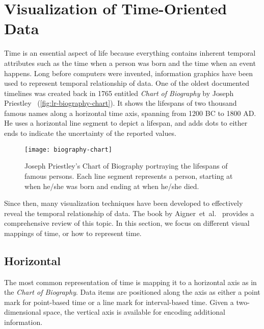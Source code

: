 \section{Visualization of Time-Oriented Data}
Time is an essential aspect of life because everything contains inherent temporal attributes such as the time when a person was born and the time when an event happens. Long before computers were invented, information graphics have been used to represent temporal relationship of data. One of the oldest documented timelines was created back in 1765 entitled \emph{Chart of Biography} by Joseph Priestley~\cite{Priestley1765} (\autoref{fig:lr-biography-chart}). It shows the lifespans of two thousand famous names along a horizontal time axis, spanning from 1200 BC to 1800 AD. He uses a horizontal line segment to depict a lifespan, and adds dots to either ends to indicate the uncertainty of the reported values. 

\begin{figure}[!htb]
	\centering
	\texttt{[image: biography-chart]}
	\caption{Joseph Priestley's Chart of Biography portraying the lifespans of famous persons. Each line segment represents a person, starting at when he/she was born and ending at when he/she died. }
	\label{fig:lr-biography-chart}
\end{figure}

Since then, many visualization techniques have been developed to effectively reveal the temporal relationship of data. The book by Aigner~et~al.~\cite{Aigner2011} provides a comprehensive review of this topic. In this section, we focus on different visual mappings of time, or how to represent time.

\subsection{Horizontal}
The most common representation of time is mapping it to a horizontal axis as in the \emph{Chart of Biography}. Data items are positioned along the axis as either a point mark for point-based time or a line mark for interval-based time. Given a two-dimensional space, the vertical axis is available for encoding additional information.

